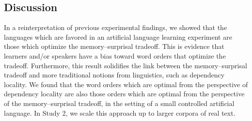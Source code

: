 %
%
%
%
%
%
%
%
%
%
%




\subsection{Discussion}

In a reinterpretation of previous experimental findings, we showed that the languages which are favored in an artificial language learning experiment are those which optimize the memory--surprisal tradeoff.
This is evidence that learners and/or speakers have a bias toward word orders that optimize the tradeoff. 
Furthermore, this result solidifies the link between the memory--surprisal tradeoff and more traditional notions from linguistics, such as dependency locality. 
We found that the word orders which are optimal from the perspective of dependency locality are also those orders which are optimal from the perspective of the memory--surprisal tradeoff, in the setting of a small controlled artificial language.
In Study 2, we scale this approach up to larger corpora of real text.
